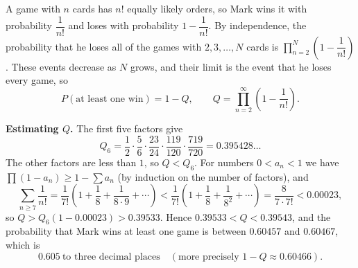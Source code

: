A game with $n$ cards has $n!$ equally likely orders, so Mark wins it with probability $\dfrac{1}{n!}$ and loses with probability $1-\dfrac{1}{n!}$. By independence, the probability that he loses all of the games with $2,3,\dots,N$ cards is $\displaystyle\prod_{n=2}^{N}\left(1-\dfrac{1}{n!}\right)$. These events decrease as $N$ grows, and their limit is the event that he loses every game, so
\[
P(\text{at least one win})=1-Q,\qquad Q=\prod_{n=2}^{\infty}\left(1-\dfrac{1}{n!}\right).
\]

\textbf{Estimating $Q$.} The first five factors give
\[
Q_6=\dfrac{1}{2}\cdot\dfrac{5}{6}\cdot\dfrac{23}{24}\cdot\dfrac{119}{120}\cdot\dfrac{719}{720}=0.395428\ldots
\]
The other factors are less than $1$, so $Q<Q_6$. For numbers $0<a_n<1$ we have $\prod(1-a_n)\ge1-\sum a_n$ (by induction on the number of factors), and
\[
\sum_{n\ge7}\dfrac{1}{n!}=\dfrac{1}{7!}\left(1+\dfrac{1}{8}+\dfrac{1}{8\cdot9}+\cdots\right)<\dfrac{1}{7!}\left(1+\dfrac{1}{8}+\dfrac{1}{8^2}+\cdots\right)=\dfrac{8}{7\cdot7!}<0.00023 ,
\]
so $Q>Q_6(1-0.00023)>0.39533$. Hence $0.39533<Q<0.39543$, and the probability that Mark wins at least one game is between $0.60457$ and $0.60467$, which is
\[
\boxed{0.605}\ \text{to three decimal places}\quad(\text{more precisely }1-Q\approx0.60466).
\]
